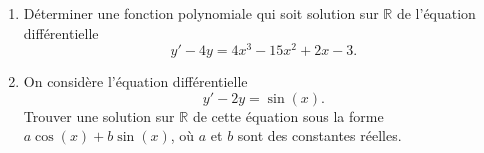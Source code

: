 
\begin{exercice}\label{exostarterST-0020}

  \begin{enumerate}
  \item Déterminer une fonction polynomiale qui soit solution sur $\mathbb{R}$ de l'équation différentielle  
    \begin{equation}
      y'-4y=4x^3-15x^2+2x-3.
    \end{equation}
    \item On considère l'équation différentielle
      \begin{equation}
        y'-2y=\sin (x).
      \end{equation}
      Trouver une solution sur $\mathbb{R}$ de cette équation sous la forme $a\cos (x)+ b\sin (x)$, où $a$ et $b$ sont des constantes réelles.
  \end{enumerate}


\end{exercice}
